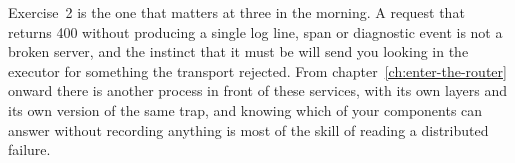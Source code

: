 Exercise~2 is the one that matters at three in the morning. A request that
returns 400 without producing a single log line, span or diagnostic event is not
a broken server, and the instinct that it must be will send you looking in the
executor for something the transport rejected. From
chapter~\ref{ch:enter-the-router} onward there is another process in front of
these services, with its own layers and its own version of the same trap, and
knowing which of your components can answer without recording anything is most
of the skill of reading a distributed failure.
